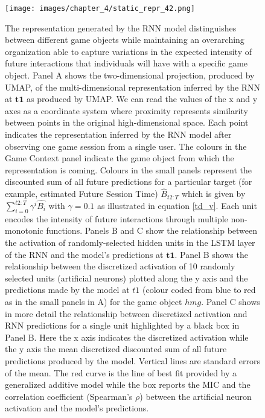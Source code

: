 \begin{figure}[ht]
\centering
\texttt{[image: images/chapter\_4/static\_repr\_42.png]}
\caption[\textbf{Lower dimensional representation of the latent state generated by the RNN architecture}]{The representation generated by the RNN model distinguishes between different game objects while maintaining an overarching organization able to capture variations in the expected intensity of future interactions that individuals will have with a specific game object. Panel A shows the two-dimensional projection, produced by UMAP, of the multi-dimensional representation inferred by the RNN at $\mathbf{t1}$ as produced by UMAP. We can read the values of the x and y axes as a coordinate system where proximity represents similarity between points in the original high-dimensional space. Each point indicates the representation inferred by the RNN model after observing one game session from a single user. The colours in the Game Context panel indicate the game object from which the representation is coming. Colours in the small panels represent the discounted sum of all future predictions for a particular target (for example, estimated Future Session Time) $\widehat{B}_{t2:T}$ which is given by $\sum_{i=0}^{t2:T} \gamma^i\widehat{B_i}$ with $\gamma=0.1$ as illustrated in equation \ref{td_v}. Each unit  encodes the intensity of future interactions through multiple non-monotonic functions. Panels B and C show the relationship between the activation of randomly-selected hidden units in the LSTM layer of the RNN and the model's predictions at $\mathbf{t1}$. Panel B shows the relationship between the discretized activation of 10 randomly selected units (artificial neurons) plotted along the y axis and the predictions made by the model at $t1$ (colour coded from blue to red as in the small panels in A) for the game object $hmg$. Panel C shows in more detail the relationship between discretized activation and RNN predictions for a single unit highlighted by a black box in Panel B. Here the x axis indicates the discretized activation while the y axis the mean discretized discounted sum of all future predictions produced by the model. Vertical lines are standard errors of the mean. The red curve is the line of best fit provided by a generalized additive model \cite{serven2018} while the box reports the MIC and the correlation coefficient (Spearman's $\rho$) between the artificial neuron activation and the model's predictions.}
\label{full_panel_static}
\end{figure}

